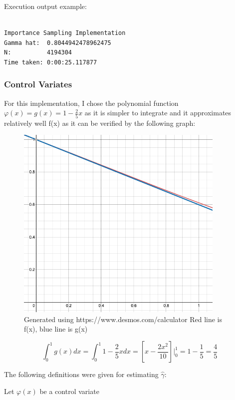 \documentclass{homework}
\begin{document}
Execution output example:
\begin{lstlisting}

Importance Sampling Implementation
Gamma hat:  0.8044942478962475
N:          4194304
Time taken: 0:00:25.117877
\end{lstlisting}









\subsubsection{Control Variates}

For this implementation, I chose the polynomial function $\varphi(x) = g(x) = 1 - \frac{2}{5}x$ as it is simpler to integrate and it approximates relatively well f(x) as it can be verified by the following graph:

\begin{figure}[htp]
    \centering
    \includegraphics[width=10cm]{Screen Shot 2021-05-16 at 17.28.37}
    \caption{Generated using https://www.desmos.com/calculator \n Red line is f(x), blue line is g(x)}
\end{figure}

\begin{equation}
    \int_0^1 g(x) dx= \int_0^1 1 - \frac{2}{5}x dx= [x - \frac{2x^2}{10}]|_0^1 = 1 - \frac{1}{5} = \frac{4}{5}
\end{equation}

The following definitions were given for estimating $\hat \gamma$:

Let $\varphi(x)$ be a control variate
\end{document}

